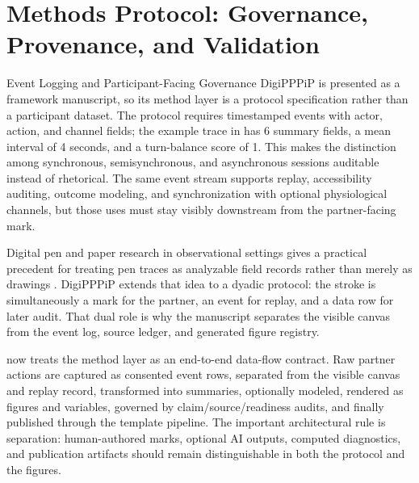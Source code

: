 \documentclass[
  ignorenonframetext,
]{beamer}
\author{\texorpdfstring{}{}}
\date{}
\begin{document}
\section{Methods Protocol: Governance, Provenance, and
Validation}\label{sec:methods_protocol}

\begin{frame}{Event Logging and
Participant-Facing Governance}
\protect{}\label{event-logging-and-participant-facing-governance}
DigiPPPiP is presented as a framework manuscript, so its method layer is
a protocol specification rather than a participant dataset. The protocol
requires timestamped events with actor, action, and channel fields; the
example trace in  has 6 summary fields,
a mean interval of 4 seconds, and a turn-balance score of 1. This makes
the distinction among synchronous, semisynchronous, and asynchronous
sessions auditable instead of rhetorical. The same event stream supports
replay, accessibility auditing, outcome modeling, and synchronization
with optional physiological channels, but those uses must stay visibly
downstream from the partner-facing mark.

Digital pen and paper research in observational settings gives a
practical precedent for treating pen traces as analyzable field records
rather than merely as drawings . DigiPPPiP
extends that idea to a dyadic protocol: the stroke is simultaneously a
mark for the partner, an event for replay, and a data row for later
audit. That dual role is why the manuscript separates the visible canvas
from the event log, source ledger, and generated figure registry.

 now treats the method layer as an
end-to-end data-flow contract. Raw partner actions are captured as
consented event rows, separated from the visible canvas and replay
record, transformed into summaries, optionally modeled, rendered as
figures and variables, governed by claim/source/readiness audits, and
finally published through the template pipeline. The important
architectural rule is separation: human-authored marks, optional AI
outputs, computed diagnostics, and publication artifacts should remain
distinguishable in both the protocol and the figures.


\end{frame}
\end{document}

